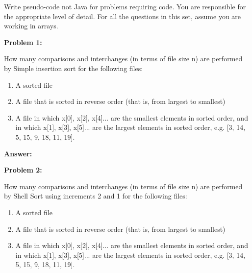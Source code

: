 \documentclass[10pt,letterpaper,final]{report}
\begin{document}
\begin{center}
  \vline
\end{center}

\medskip

Write pseudo-code not Java for problems requiring code. You are responsible for the appropriate level of detail. For all the questions in this set, assume you are working in arrays.

\medskip

\noindent\textbf{Problem 1:}
\medskip

How many comparisons and interchanges (in terms of file size n) are performed by Simple insertion sort for the following files:
\begin{enumerate}
  \item A sorted file
  \item A file that is sorted in reverse order (that is, from largest to smallest)
  \item A file in which x[0], x[2], x[4]... are the smallest elements in sorted order, and in which x[1], x[3], x[5]... are the largest elements in sorted order, e.g.  [3, 14, 5, 15, 9, 18, 11, 19].
\end{enumerate}

\medskip
\noindent\textbf{Answer:}
\medskip

\noindent\textbf{Problem 2:}
\medskip

How many comparisons and interchanges (in terms of file size n) are performed by Shell Sort using increments 2 and 1 for the following files:
\begin{enumerate}
  \item A sorted file
  \item A file that is sorted in reverse order (that is, from largest to smallest)
  \item A file in which x[0], x[2], x[4]... are the smallest elements in sorted order, and in which x[1], x[3], x[5]... are the largest elements in sorted order, e.g. [3, 14, 5, 15, 9, 18, 11, 19].
\end{enumerate}
\end{document}
